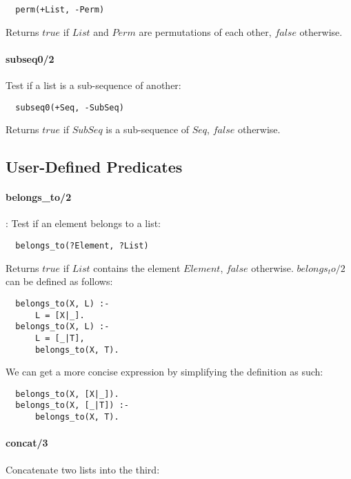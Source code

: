 \documentclass{article}
\begin{document}
\begin{multicols}{2}
  \begin{lstlisting}
  perm(+List, -Perm)
  \end{lstlisting} 
  
  Returns $true$ if $List$ and $Perm$ are permutations of each other, $false$ otherwise.
  
  \paragraph{subseq0/2} Test if a list is a sub-sequence of another:
  
  \begin{lstlisting}
  subseq0(+Seq, -SubSeq)
  \end{lstlisting} 
  
  Returns $true$ if $SubSeq$ is a sub-sequence of $Seq$, $false$ otherwise.
  
  \subsection{User-Defined Predicates}

  \paragraph{belongs\_to/2}: Test if an element belongs to a list:
  
  \begin{lstlisting}
  belongs_to(?Element, ?List)
  \end{lstlisting} 
  
  Returns $true$ if $List$ contains the element $Element$, $false$ otherwise. $belongs_to/2$ can be defined as follows:

  \begin{lstlisting}
  belongs_to(X, L) :-
      L = [X|_].
  belongs_to(X, L) :-
      L = [_|T],
      belongs_to(X, T).
  \end{lstlisting} 
  
  We can get a more concise expression by simplifying the definition as such:

  \begin{lstlisting}
  belongs_to(X, [X|_]).
  belongs_to(X, [_|T]) :-
      belongs_to(X, T).
  \end{lstlisting} 
  
  \paragraph{concat/3} Concatenate two lists into the third:
  

\end{multicols}
\end{document}
